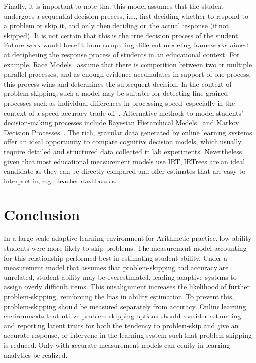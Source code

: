 \documentclass{edm_article}
\begin{document}
Finally, it is important to note that this model assumes that the student undergoes a sequential decision process, i.e., first deciding whether to respond to a problem or skip it, and only then deciding on the actual response (if not skipped). It is not certain that this is the true decision process of the student. Future work would benefit from comparing different modeling frameworks aimed at deciphering the response process of students in an educational context. For example, Race Models~\cite{heathcote2022winner} assume that there is competition between two or multiple parallel processes, and as enough evidence accumulates in support of one process, this process wins and determines the subsequent decision. In the context of problem-skipping, such a model may be suitable for detecting fine-grained processes such as individual differences in processing speed, especially in the context of a speed accuracy trade-off~\cite{heathcote2022winner, evans2018modeling}. Alternative methods to model students' decision-making processes include Bayesian Hierarchical Models~\cite{sawyer2018modeling, lee2014bayesian} and Markov Decision Processes~\cite{lamar2018markov, puterman1994markov}. The rich, granular data generated by online learning systems offer an ideal opportunity to compare cognitive decision models, which usually require detailed and structured data collected in lab experiments. Nevertheless, given that most educational measurement models use IRT, IRTrees are an ideal candidate as they can be directly compared and offer estimates that are easy to interpret in, e.g., teacher dashboards.

\section{Conclusion}
In a large-scale adaptive learning environment for Arithmetic practice, low-ability students were more likely to skip problems. The measurement model accounting for this relationship performed best in estimating student ability. Under a measurement model that assumes that problem-skipping and accuracy are unrelated, student ability may be overestimated, leading adaptive systems to assign overly difficult items. This misalignment increases the likelihood of further problem-skipping, reinforcing the bias in ability estimation. To prevent this, problem-skipping should be measured separately from accuracy. Online learning environments that utilize problem-skipping options should consider estimating and reporting latent traits for both the tendency to problem-skip and give an accurate response, or intervene in the learning system such that problem-skipping is reduced. Only with accurate measurement models can equity in learning analytics be realized. 


 
\end{document}
